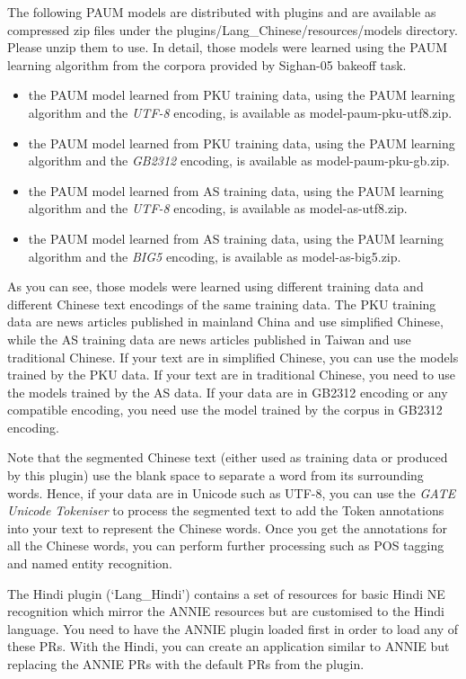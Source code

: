 The following PAUM models are distributed with plugins and are available as
compressed zip files under the plugins/Lang\_Chinese/resources/models 
directory. Please unzip them to use. In detail, those models were learned using 
the PAUM learning algorithm from the corpora provided by Sighan-05 bakeoff task.
\begin{itemize}
\item the PAUM model learned from PKU training data, using the PAUM
  learning algorithm and the {\em UTF-8} encoding, is available as 
  model-paum-pku-utf8.zip.
\item the PAUM model learned from PKU training data, using the PAUM
  learning algorithm and the {\em GB2312} encoding, is available as 
  model-paum-pku-gb.zip.
\item the PAUM model learned from AS training data, using the PAUM
  learning algorithm and the {\em UTF-8} encoding, is available as 
  model-as-utf8.zip.
\item the PAUM model learned from AS training data, using the PAUM
  learning algorithm and the {\em BIG5} encoding, is available as
  model-as-big5.zip.
\end{itemize}

As you can see, those models were learned using different training data and
different Chinese text encodings of the same training data. The PKU training data
are news articles published in mainland China and use simplified Chinese,
while the AS training data are news articles published in Taiwan and use
traditional Chinese. If your text are in simplified Chinese, you can use the
models trained by the PKU data. If your text are in traditional Chinese, you
need to use the models trained by the AS data. If your data are in GB2312 encoding
or any compatible encoding, you need use the model trained by the corpus in GB2312
encoding.

Note that the segmented Chinese text (either used as training data or produced
by this plugin) use the blank space to separate a word from its surrounding
words. Hence, if your data are in Unicode such as UTF-8, you can use the {\em
  GATE Unicode Tokeniser} to process the segmented text to add the Token
annotations into your text to represent the Chinese words.  Once you get the
annotations for all the Chinese words, you can perform further processing such
as POS tagging and named entity recognition.


The Hindi plugin (`Lang\_Hindi') contains a set of resources for basic Hindi NE
recognition which mirror the ANNIE resources but are customised to the Hindi
language. You need to have the ANNIE plugin loaded first in order to load any of
these PRs. With the Hindi, you can create an application similar to ANNIE but
replacing the ANNIE PRs with the default PRs from the plugin.

